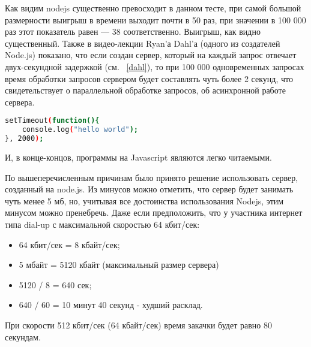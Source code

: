 Как видим nodejs существенно превосходит в данном тесте, при самой большой размерности выигрыш в времени выходит почти в 50 раз, при значении в 100 000 раз этот показатель равен — 38 соответственно. Выигрыш, как видно существенный.
Также в видео-лекции Ryan'а Dahl'а (одного из создателей Node.js) показано, что если создан сервер, который на каждый запрос отвечает двух-секундной задержкой (см. ~\ref{dahl}), то при 100 000 одновременных запросах время обработки запросов сервером будет составлять чуть более 2 секунд, что свидетельствует о параллельной обработке запросов, об асинхронной работе сервера. 
\begin{lstlisting}[numbers=none, language=bash, caption =Тело функции обработки запроса в Node.js]
  setTimeout(function(){
	console.log("hello world");
}, 2000);
\end{lstlisting}

И, в конце-концов, программы на Javascript являются легко читаемыми.

По вышеперечисленным причинам было принято решение использовать сервер, созданный на node.js. Из минусов можно отметить, что сервер будет занимать чуть менее 5 мб, но, учитывая все достоинства использования Nodejs, этим минусом можно пренебречь. Даже если предположить, что у участника интернет типа dial-up с максимальной скоростью 64 кбит/сек:
\begin{itemize}
 \item 64 кбит/сек = 8 кбайт/сек;
  \item 5 мбайт = 5120 кбайт  (максимальный размер сервера)
  \item 5120 / 8 = 640 сек;
  \item 640 / 60 = 10 минут 40 секунд - худший расклад.
\end{itemize}
При скорости 512 кбит/сек (64 кбайт/сек) время закачки будет равно 80 секундам.
